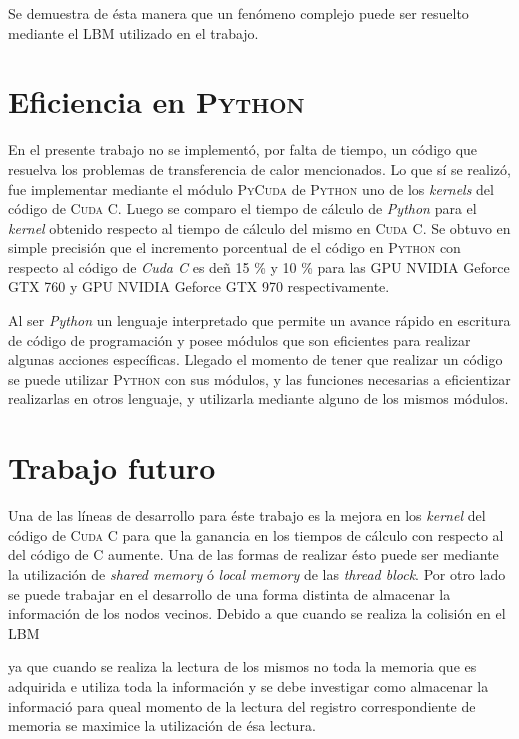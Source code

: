 Se demuestra de ésta manera que un fenómeno complejo puede ser resuelto mediante el LBM utilizado en el trabajo.

\section{Eficiencia en \textsc{Python}}

En el presente trabajo no se implementó, por falta de tiempo, un código que resuelva los problemas de transferencia de calor mencionados. Lo que sí se realizó, fue implementar mediante el módulo \textsc{PyCuda} de \textsc{Python} uno de los \textit{kernels} del código de \textsc{Cuda C}. Luego se comparo el tiempo de cálculo de \textit{Python} para el \textit{kernel} obtenido respecto al tiempo de cálculo del mismo en \textsc{Cuda C}. Se obtuvo en simple precisión que el incremento porcentual de el código en \textsc{Python} con respecto al código de \textit{Cuda C} es deñ 15 \% y 10 \% para las GPU NVIDIA Geforce GTX 760 y GPU NVIDIA Geforce GTX 970 respectivamente.

Al ser \textit{Python} un lenguaje interpretado que permite un avance rápido en escritura de código de programación y posee módulos que son eficientes para realizar algunas acciones específicas. Llegado el momento de tener que realizar un código se puede utilizar \textsc{Python} con sus módulos, y las funciones necesarias a eficientizar realizarlas en otros lenguaje, y utilizarla mediante alguno de los mismos módulos.


\section{Trabajo futuro}

Una de las líneas de desarrollo para éste trabajo es la mejora en los \textit{kernel} del código de \textsc{Cuda C} para que la ganancia en los tiempos de cálculo con respecto al del código de \textsc{C} aumente. Una de las formas de realizar ésto puede ser mediante la utilización de \textit{shared memory} ó \textit{local memory} de las \textit{thread block}. Por otro lado se puede trabajar en el desarrollo de una forma distinta de almacenar la información de los nodos vecinos. Debido a que cuando se realiza la colisión en el LBM 


 ya que cuando se realiza la lectura de los mismos no toda la memoria que es adquirida e utiliza toda la información y se debe investigar como almacenar la informació para queal momento de la lectura del registro correspondiente de memoria se maximice la utilización de ésa lectura.

